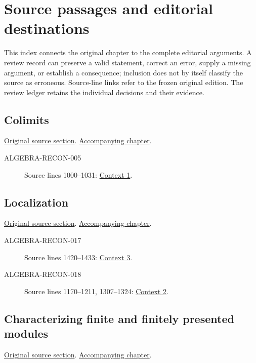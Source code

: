 \section{Source passages and editorial destinations}
This index connects the original chapter to the complete editorial arguments. A review record can preserve a valid statement, correct an error, supply a missing argument, or establish a consequence; inclusion does not by itself classify the source as erroneous. Source-line links refer to the frozen original edition. The review ledger retains the individual decisions and their evidence.

\subsection{Colimits}
\hypertarget{algebra-source-section-colimits}{}
\noindent\href{https://github.com/stacks/stacks-project/blob/a04446e57ec1fbc252a871afcec7752fb2807b14/algebra.tex\#L702}{Original source section}. \href{algebra.pdf\#nameddest=section-colimits}{Accompanying chapter}.

\begin{description}
\item[ALGEBRA-RECON-005] Source lines 1000--1031: \hyperlink{algebra-context-001}{Context 1}.
\end{description}

\subsection{Localization}
\hypertarget{algebra-source-section-localization}{}
\noindent\href{https://github.com/stacks/stacks-project/blob/a04446e57ec1fbc252a871afcec7752fb2807b14/algebra.tex\#L1038}{Original source section}. \href{algebra.pdf\#nameddest=section-localization}{Accompanying chapter}.

\begin{description}
\item[ALGEBRA-RECON-017] Source lines 1420--1433: \hyperlink{algebra-context-003}{Context 3}.
\item[ALGEBRA-RECON-018] Source lines 1170--1211, 1307--1324: \hyperlink{algebra-context-002}{Context 2}.
\end{description}

\subsection{Characterizing finite and finitely presented modules}
\hypertarget{algebra-source-section-colim-and-hom}{}
\noindent\href{https://github.com/stacks/stacks-project/blob/a04446e57ec1fbc252a871afcec7752fb2807b14/algebra.tex\#L1580}{Original source section}. \href{algebra.pdf\#nameddest=section-colim-and-hom}{Accompanying chapter}.

